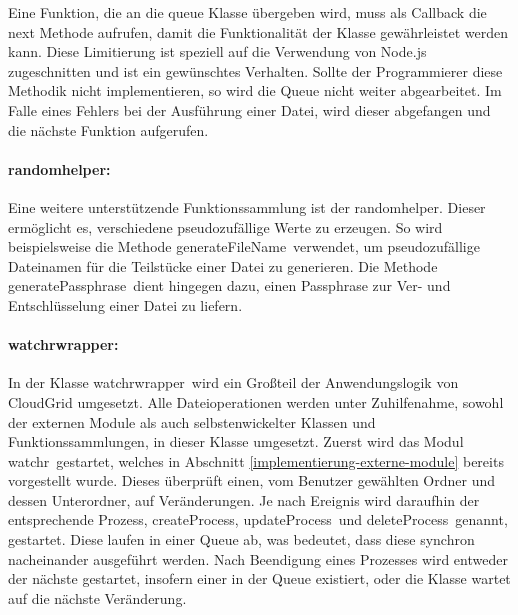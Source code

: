Eine Funktion, die an die queue Klasse übergeben wird, muss als Callback die next Methode aufrufen, damit die Funktionalität der Klasse gewährleistet werden kann.
Diese Limitierung ist speziell auf die Verwendung von Node.js zugeschnitten und ist ein gewünschtes Verhalten.
Sollte der Programmierer diese Methodik nicht implementieren, so wird die Queue nicht weiter abgearbeitet.
Im Falle eines Fehlers bei der Ausführung einer Datei, wird dieser abgefangen und die nächste Funktion aufgerufen.

\paragraph{randomhelper:}Eine weitere unterstützende Funktionssammlung ist der \frqq randomhelper\flqq .
Dieser ermöglicht es, verschiedene pseudozufällige Werte zu erzeugen.
So wird beispielsweise die Methode \frqq generateFileName\flqq\ verwendet, um pseudozufällige Dateinamen für die Teilstücke einer Datei zu generieren.
Die Methode \frqq generatePassphrase\flqq\ dient hingegen dazu, einen Passphrase zur Ver- und Entschlüsselung einer Datei zu liefern.

\paragraph{watchrwrapper:}In der Klasse \frqq watchrwrapper\flqq\ wird ein Großteil der Anwendungslogik von CloudGrid umgesetzt.
Alle Dateioperationen werden unter Zuhilfenahme, sowohl der externen Module als auch selbstenwickelter Klassen und Funktionssammlungen, in dieser Klasse umgesetzt.
Zuerst wird das Modul \frqq watchr\flqq\ gestartet, welches in Abschnitt \ref{implementierung-externe-module} bereits vorgestellt wurde.
Dieses überprüft einen, vom Benutzer gewählten Ordner und dessen Unterordner, auf Veränderungen.
Je nach Ereignis wird daraufhin der entsprechende Prozess, \frqq createProcess\flqq , \frqq updateProcess\flqq\ und \frqq deleteProcess\flqq\ genannt, gestartet.
Diese laufen in einer Queue ab, was bedeutet, dass diese synchron nacheinander ausgeführt werden.
Nach Beendigung eines Prozesses wird entweder der nächste gestartet, insofern einer in der Queue existiert, oder die Klasse wartet auf die nächste Veränderung.

